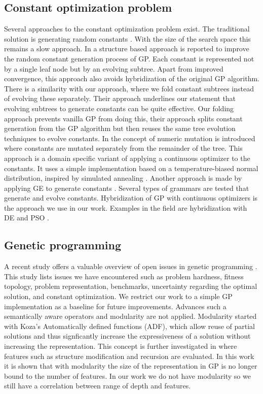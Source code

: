 \subsection{Constant optimization problem}
Several approaches to the constant optimization problem exist. The traditional solution is generating random constants \citep{GP}. With the size of the search space this remains a slow approach.
In \citep{GPConstAlter} a structure based approach is reported to improve the random constant generation process of GP. Each constant is represented not by a single leaf node but by an evolving subtree. Apart from improved convergence, this approach also avoids hybridization of the original GP algorithm. There is a similarity with our approach, where we fold constant subtrees instead of evolving these separately. Their approach underlines our statement that evolving subtrees to generate constants can be quite effective. Our folding approach prevents vanilla GP from doing this, their approach splits constant generation from the GP algorithm but then reuses the same tree evolution techniques to evolve constants.
In \citep{GPConst} the concept of numeric mutation is introduced where constants are mutated separately from the remainder of the tree. This approach is a domain specific variant of applying a continuous optimizer to the constants. It uses a simple implementation based on a temperature-biased normal distribution, inspired by simulated annealing \citep{SA}.
Another approach is made by applying GE to generate constants \citep{GPConstGE}. Several types of grammars are tested that generate and evolve constants.
Hybridization of GP with continuous optimizers is the approach we use in our work. Examples in the field are hybridization with DE \citep{GPDE} and PSO \citep{SRBaseline}.


\subsection{Genetic programming}
A recent study offers a valuable overview of open issues in genetic programming \citep{GPIssues}. This study lists issues we have encountered such as problem hardness, fitness topology, problem representation, benchmarks, uncertainty regarding the optimal solution, and constant optimization.
We restrict our work to a simple GP implementation as a baseline for future improvements. Advances such a semantically aware operators \citep {GPSemantics} and modularity are not applied. Modularity started with Koza's \cite{GP} Automatically defined functions (ADF), which allow reuse of partial solutions and thus signficantly increase the expressiveness of a solution without increasing the representation. This concept is further investigated in \citep{GPModularity} where features such as structure modification and recursion are evaluated. In this work it is shown that with modularity the size of the representation in GP is no longer bound to the number of features. In our work we do not have modularity so we still have a correlation between range of depth and features.
\citep{GE}
\citep{GEDE}

